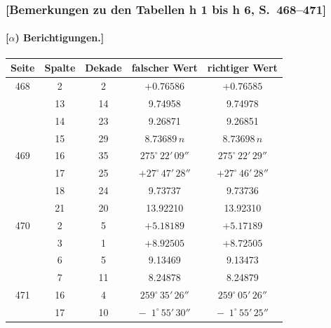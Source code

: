 \documentclass[12pt,a4paper]{article}
\theoremstyle{plain}
\theoremstyle{definition}
\theoremstyle{remark}
\begin{document}
\newpage
\subsubsection*{[Bemerkungen zu den Tabellen h 1 bis h 6, S.~468--471]}

\paragraph*{[$\alpha$) Berichtigungen.]}

\begin{small}
\end{small}

\begin{footnotesize}
\begin{center}
\begin{tabular}{|c|c|c|c|c|}
\hline
Seite & Spalte & Dekade & falscher Wert & richtiger Wert \\
\hline
468 & 2 & 2 & $+0.76586$ & $+0.76585$ \\
    & 13 & 14 & 9.74958 & 9.74978 \\
    & 14 & 23 & 9.26871 & 9.26851 \\
    & 15 & 29 & $8.73689\,n$ & $8.73698\,n$ \\
469 & 16 & 35 & $275^{\circ}\,22'\,09''$ & $275^{\circ}\,22'\,29''$ \\
    & 17 & 25 & $+27^{\circ}\,47'\,28''$ & $+27^{\circ}\,46'\,28''$ \\
    & 18 & 24 & 9.73737 & 9.73736 \\
    & 21 & 20 & 13.92210 & 13.92310 \\
\hline
470 & 2 & 5 & $+5.18189$ & $+5.17189$ \\
    & 3 & 1 & $+8.92505$ & $+8.72505$ \\
    & 6 & 5 & 9.13469 & 9.13473 \\
    & 7 & 11 & 8.24878 & 8.24879 \\
471 & 16 & 4 & $259^{\circ}\,35'\,26''$ & $259^{\circ}\,05'\,26''$ \\
    & 17 & 10 & $-\phantom{0}1^{\circ}\,55'\,30''$ & $-\phantom{0}1^{\circ}\,55'\,25''$ \\
\hline
\end{tabular}
\end{center}
\end{footnotesize}
\end{document}

